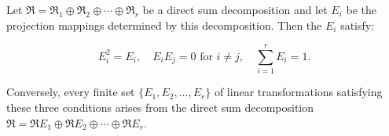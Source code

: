 Let $\mathfrak{R} = \mathfrak{R}_1 \oplus \mathfrak{R}_2 \oplus \cdots \oplus \mathfrak{R}_r$ be a direct sum decomposition and let $E_i$ be the projection mappings determined by this decomposition. Then the $E_i$ satisfy:

$$E_i^2 = E_i, \quad E_i E_j = 0 \text{ for } i \neq j, \quad \sum_{i=1}^r E_i = 1.$$

Conversely, every finite set $\{E_1, E_2, \ldots, E_r\}$ of linear transformations satisfying these three conditions arises from the direct sum decomposition $\mathfrak{R} = \mathfrak{R}E_1 \oplus \mathfrak{R}E_2 \oplus \cdots \oplus \mathfrak{R}E_r$.
